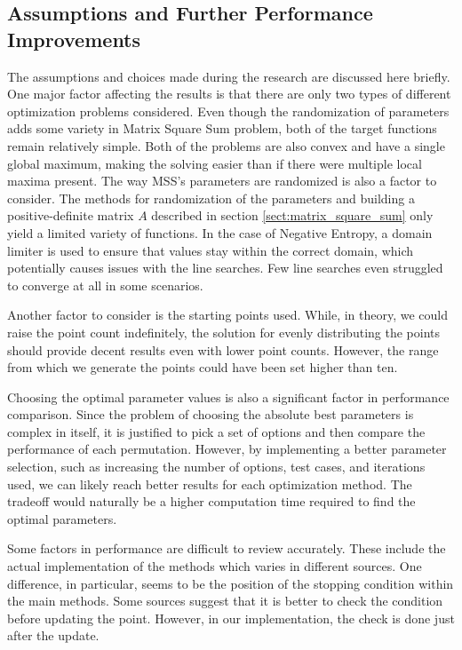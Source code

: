 \documentclass[a4paper,english,titlepage,12pt]{article}
\begin{document}
\subsection{Assumptions and Further Performance Improvements}

The assumptions and choices made during the research are discussed here briefly. One major factor affecting the results is that there are only two types of different optimization problems considered. Even though the randomization of parameters adds some variety in Matrix Square Sum problem, both of the target functions remain relatively simple. Both of the problems are also convex and have a single global maximum, making the solving easier than if there were multiple local maxima present. The way MSS's parameters are randomized is also a factor to consider. The methods for randomization of the parameters and building a positive-definite matrix $A$ described in section \ref{sect:matrix_square_sum} only yield a limited variety of functions. In the case of Negative Entropy, a domain limiter is used to ensure that values stay within the correct domain, which potentially causes issues with the line searches. Few line searches even struggled to converge at all in some scenarios.

Another factor to consider is the starting points used. While, in theory, we could raise the point count indefinitely, the solution for evenly distributing the points should provide decent results even with lower point counts. However, the range from which we generate the points could have been set higher than ten.

Choosing the optimal parameter values is also a significant factor in performance comparison. Since the problem of choosing the absolute best parameters is complex in itself, it is justified to pick a set of options and then compare the performance of each permutation. However, by implementing a better parameter selection, such as increasing the number of options, test cases, and iterations used, we can likely reach better results for each optimization method. The tradeoff would naturally be a higher computation time required to find the optimal parameters.

Some factors in performance are difficult to review accurately. These include the actual implementation of the methods which varies in different sources. One difference, in particular, seems to be the position of the stopping condition within the main methods. Some sources suggest that it is better to check the condition before updating the point. However, in our implementation, the check is done just after the update. \cite{book:convex_optimization} \cite{book:nonlinear_programming}
\end{document}
